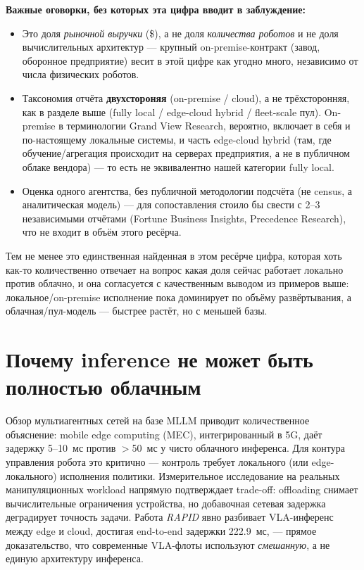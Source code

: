 \documentclass[11pt]{article}
\begin{document}
\textbf{Важные оговорки, без которых эта цифра вводит в заблуждение:}
\begin{itemize}
  \item Это доля \emph{рыночной выручки} (\$), а не доля \emph{количества роботов} и
        не доля вычислительных архитектур — крупный on-premise-контракт (завод,
        оборонное предприятие) весит в этой цифре как угодно много, независимо от
        числа физических роботов.
  \item Таксономия отчёта \textbf{двухстороняя} (on-premise / cloud), а не
        трёхсторонняя, как в разделе выше (fully local / edge-cloud hybrid /
        fleet-scale пул). \guillemotleft On-premise\guillemotright{} в терминологии
        Grand View Research, вероятно, включает в себя и по-настоящему локальные
        системы, и часть edge-cloud hybrid (там, где обучение/агрегация происходит на
        серверах предприятия, а не в публичном облаке вендора) — то есть не
        эквивалентно нашей категории \guillemotleft fully local\guillemotright.
  \item Оценка одного агентства, без публичной методологии подсчёта (не census, а
        аналитическая модель) — для сопоставления стоило бы свести с 2--3
        независимыми отчётами (Fortune Business Insights, Precedence Research),
        что не входит в объём этого ресёрча.
\end{itemize}

Тем не менее это единственная найденная в этом ресёрче цифра, которая хоть
как-то количественно отвечает на вопрос \guillemotleft какая доля сейчас работает
локально против облачно\guillemotright, и она согласуется с качественным выводом
из примеров выше: локальное/on-premise исполнение пока доминирует по объёму
развёртывания, а облачная/пул-модель — быстрее растёт, но с меньшей базы.

\section{Почему inference не может быть полностью облачным}

Обзор мультиагентных сетей на базе MLLM \cite{mllmsurvey2026} приводит количественное
объяснение: mobile edge computing (MEC), интегрированный в 5G, даёт задержку
5--10~мс против $>$50~мс у чисто облачного инференса. Для контура управления робота
это критично — контроль требует локального (или edge-локального) исполнения политики.
Измерительное исследование \cite{offloadoverload2026} на реальных манипуляционных
workload напрямую подтверждает trade-off: offloading снимает вычислительные
ограничения устройства, но добавочная сетевая задержка деградирует точность задачи.
Работа \emph{RAPID} \cite{rapid2026} явно разбивает VLA-инференс между edge и cloud,
достигая end-to-end задержки 222.9~мс, — прямое доказательство, что современные
VLA-флоты используют \emph{смешанную}, а не единую архитектуру инференса.
\end{document}
